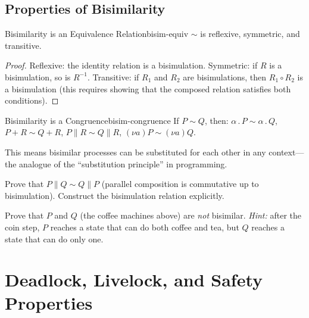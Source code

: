 \documentclass[11pt, a4paper, oneside]{book}
\newcommand{\Par}{\mathbin{\|}}
\newcommand{\pref}{\mathbin{.}}
\newcommand{\res}[1]{(\nu #1)}
\newcommand{\bisim}{\sim}
\newcounter{exercise}[chapter]
\begin{document}
\section{Properties of Bisimilarity}

\begin{thm}{Bisimilarity is an Equivalence Relation}{bisim-equiv}
$\bisim$ is reflexive, symmetric, and transitive.
\end{thm}

\begin{proof}
Reflexive: the identity relation is a bisimulation. Symmetric: if $R$ is a
bisimulation, so is $R^{-1}$. Transitive: if $R_1$ and $R_2$ are
bisimulations, then $R_1 \circ R_2$ is a bisimulation (this requires showing
that the composed relation satisfies both conditions).
\end{proof}

\begin{thm}{Bisimilarity is a Congruence}{bisim-congruence}
If $P \bisim Q$, then:
$\alpha \pref P \bisim \alpha \pref Q$, \quad
$P + R \bisim Q + R$, \quad
$P \Par R \bisim Q \Par R$, \quad
$\res{a} P \bisim \res{a} Q$.
\end{thm}

This means bisimilar processes can be substituted for each other in any
context---the analogue of the ``substitution principle'' in programming.

\begin{exercisebox}[title={Exercise 4.1}]
Prove that $P \Par Q \bisim Q \Par P$ (parallel composition is commutative
up to bisimulation). Construct the bisimulation relation explicitly.
\end{exercisebox}

\begin{exercisebox}[title={Exercise 4.2}]
Prove that $P$ and $Q$ (the coffee machines above) are \emph{not} bisimilar.
\emph{Hint:} after the coin step, $P$ reaches a state that can do both
coffee and tea, but $Q$ reaches a state that can do only one.
\end{exercisebox}

\chapter{Deadlock, Livelock, and Safety Properties}
\end{document}
